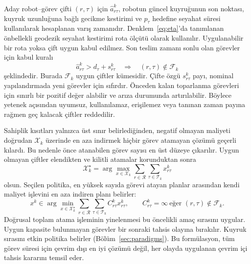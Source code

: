 \documentclass[10pt,letterpaper,onecolumn]{IEEEtran}
\begin{document}
Aday robot--görev çifti $(r,\tau)$ için $\hat a_{r\tau}^k$, robotun güncel
kuyruğunun son noktası, kuyruk uzunluğuna bağlı gecikme kestirimi ve
$p_\tau$ hedefine seyahat süresi kullanılarak hesaplanan varış zamanıdır.
Denklem~\eqref{eq:eta}'da tanımlanan önbellekli geodezik seyahat kestirimi
rota ölçütü olarak kullanılır. Uygulanabilir bir rota yoksa çift uygun kabul
edilmez. Son teslim zamanı sonlu olan görevler için kabul kuralı
\begin{equation}
  \hat a_{r\tau}^k>d_\tau+s_{r\tau}^k
  \quad\Longrightarrow\quad (r,\tau)\notin\mathcal{F}_k
  \label{eq:admission-gate}
\end{equation}
şeklindedir. Burada $\mathcal{F}_k$ uygun çiftler kümesidir. Çifte özgü
$s_{r\tau}^k$ payı, nominal yapılandırmada yeni görevler için sıfırdır.
Önceden kalan toparlanma görevleri için sınırlı bir pozitif değer alabilir ve
arıza durumunda artırılabilir. Böylece yetenek açısından uyumsuz, kullanılamaz,
erişilemez veya tanınan zaman payına rağmen geç kalacak çiftler reddedilir.

Sahiplik kısıtları yalnızca üst sınır belirlediğinden, negatif olmayan maliyeti
doğrudan $\mathcal X_k$ üzerinde en aza indirmek hiçbir görev atamayan çözümü
geçerli kılardı. Bu nedenle önce atanabilen görev sayısı en üst düzeye
çıkarılır. Uygun olmayan çiftler elendikten ve kilitli atamalar korunduktan
sonra
\begin{equation}
  \mathcal X_k^\star=\arg\max_{x\in\mathcal X_k}
  \sum_{r\in\mathcal R}\sum_{\tau\in\mathcal T_k}x_{r\tau}^k
  \label{eq:max-cardinality}
\end{equation}
olsun. Seçilen politika, en yüksek sayıda görevi atayan planlar arasından kendi
maliyet işlevini en aza indiren planı belirler:
\begin{equation}
  x^k\in\arg\min_{x\in\mathcal{X}_k^\star}
        \sum_{r\in\mathcal{R}}\sum_{\tau\in\mathcal{T}_k}
        C_{r\tau}^k x_{r\tau}^k ,
  \qquad C_{r\tau}^k=\infty\ \text{eğer }(r,\tau)\notin\mathcal{F}_k .
  \label{eq:event-surrogate}
\end{equation}
Doğrusal toplam atama işleminin yinelenmesi bu öncelikli amaç sırasını uygular.
Uygun kapasite bulunmayan görevler bir sonraki tahsis olayına bırakılır. Kuyruk
sırasını etkin politika belirler (Bölüm~\ref{sec:paradigms}). Bu formülasyon,
tüm görev süresi için çevrim dışı en iyi çözümü değil, her olayda uygulanan
çevrim içi tahsis kararını temsil eder.

\end{document}
